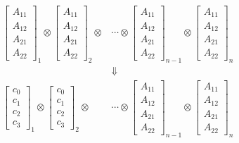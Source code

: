 \documentclass[twocolumn]{article}
\begin{document}
\begin{eqnarray}
    &\begin{bmatrix}
        A_{11} \\
        A_{12} \\
        A_{21} \\
        A_{22}
    \end{bmatrix}_1 \otimes
    \begin{bmatrix}
        A_{11} \\
        A_{12} \\
        A_{21} \\
        A_{22}
    \end{bmatrix}_2 \otimes
    &\cdots \otimes
    \begin{bmatrix}
        A_{11} \\
        A_{12} \\
        A_{21} \\
        A_{22}
    \end{bmatrix}_{n-1} \otimes
    \begin{bmatrix}
        A_{11} \\
        A_{12} \\
        A_{21} \\
        A_{22}
    \end{bmatrix}_n
    \nonumber\\
    & &\Downarrow \label{eq:vec_tpd}\\
    &\begin{bmatrix}
        c_0\\
        c_1\\
        c_2\\
        c_3
    \end{bmatrix}_1 \otimes
    \begin{bmatrix}
        c_0\\
        c_1\\
        c_2\\
        c_3
    \end{bmatrix}_2 \otimes
    &\cdots \otimes
    \begin{bmatrix}
        A_{11} \\
        A_{12} \\
        A_{21} \\
        A_{22}
    \end{bmatrix}_{n-1} \otimes
    \begin{bmatrix}
        A_{11} \\
        A_{12} \\
        A_{21} \\
        A_{22}
    \end{bmatrix}_n\nonumber
\end{eqnarray}
\end{document}
